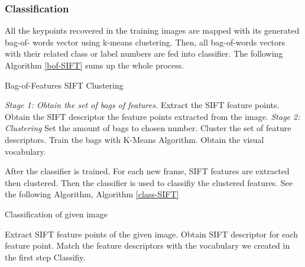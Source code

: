 \documentclass[12pt,fleqn]{book} %
\begin{document}
\subsubsection{Classification} 
All the keypoints recovered in the training images are mapped with its generated bag-of-
words vector using k-means clustering. Then, all bag-of-words vectors with their related class or 
label numbers are fed into classifier. The following Algorithm \ref{bof-SIFT} sums up the whole process. \begin{algorithm}

\begin{dBox}
	\caption{Bag-of-Features SIFT Clustering} \label{bof-SIFT}
	\begin{algorithmic}[h]
				\vspace{1em}	
				\State \emph{Stage 1: Obtain the set of bags of features.}
						\State Extract the SIFT feature points.
						\State Obtain the SIFT descriptor the feature points extracted from the image.
					\EndFor
				\vspace{1em}	
				\State \emph{Stage 2: Clustering}
					\State Set the amount of bags to chosen number.
					\State Cluster the set of feature descriptors.
					\State Train the bags with K-Means Algorithm.
					\State Obtain the visual vocabulary.
		\EndProcedure	
	\end{algorithmic}
\end{dBox}	
\end{algorithm}
\bigskip
After the classifier is trained. For each new frame, SIFT features are extracted then clustered. Then the classifier is used to classifiy the clustered features. See the following Algorithm, Algorithm \ref{class-SIFT}
\begin{algorithm}[h]
\begin{dBox}
	\caption{Classification of given image} \label{class-SIFT}
	\begin{algorithmic}[1]
				\vspace{1em}	
				\State Extract SIFT feature points of the given image.
				\State Obtain SIFT descriptor for each feature point.
				\State Match the feature descriptors with the vocabulary we created in the first step
				\State Classifiy.

		\EndProcedure	
	\end{algorithmic}
\end{dBox}	
\end{algorithm}
\end{document}
